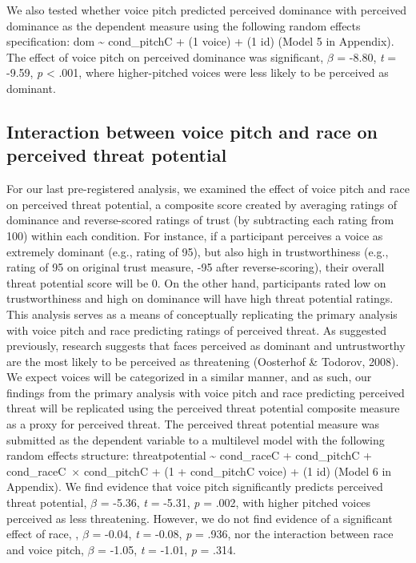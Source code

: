 \documentclass[
  english,
  man, noextraspace,floatsintext]{apa6}
\begin{document}
We also tested whether voice pitch predicted perceived dominance with perceived dominance as the dependent measure using the following random effects specification: dom \textasciitilde{} cond\_pitchC + (1 \textbar{} voice) + (1 \textbar{} id) (Model 5 in Appendix). The effect of voice pitch on perceived dominance was significant, \(\beta\) = -8.80, \emph{t} = -9.59, \emph{p} \textless{} .001, where higher-pitched voices were less likely to be perceived as dominant.

\hypertarget{interaction-between-voice-pitch-and-race-on-perceived-threat-potential}{%
\subsection{Interaction between voice pitch and race on perceived threat potential}\label{interaction-between-voice-pitch-and-race-on-perceived-threat-potential}}

For our last pre-registered analysis, we examined the effect of voice pitch and race on perceived threat potential, a composite score created by averaging ratings of dominance and reverse-scored ratings of trust (by subtracting each rating from 100) within each condition. For instance, if a participant perceives a voice as extremely dominant (e.g., rating of 95), but also high in trustworthiness (e.g., rating of 95 on original trust measure, -95 after reverse-scoring), their overall threat potential score will be 0. On the other hand, participants rated low on trustworthiness and high on dominance will have high threat potential ratings. This analysis serves as a means of conceptually replicating the primary analysis with voice pitch and race predicting ratings of perceived threat. As suggested previously, research suggests that faces perceived as dominant and untrustworthy are the most likely to be perceived as threatening (Oosterhof \& Todorov, 2008). We expect voices will be categorized in a similar manner, and as such, our findings from the primary analysis with voice pitch and race predicting perceived threat will be replicated using the perceived threat potential composite measure as a proxy for perceived threat. The perceived threat potential measure was submitted as the dependent variable to a multilevel model with the following random effects structure: threatpotential \textasciitilde{} cond\_raceC + cond\_pitchC + cond\_raceC~\(\times\) cond\_pitchC + (1 + cond\_pitchC \textbar{} voice) + (1 \textbar{} id) (Model 6 in Appendix). We find evidence that voice pitch significantly predicts perceived threat potential, \(\beta\) = -5.36, \emph{t} = -5.31, \emph{p} = .002, with higher pitched voices perceived as less threatening. However, we do not find evidence of a significant effect of race, , \(\beta\) = -0.04, \emph{t} = -0.08, \emph{p} = .936, nor the interaction between race and voice pitch, \(\beta\) = -1.05, \emph{t} = -1.01, \emph{p} = .314.
\end{document}

